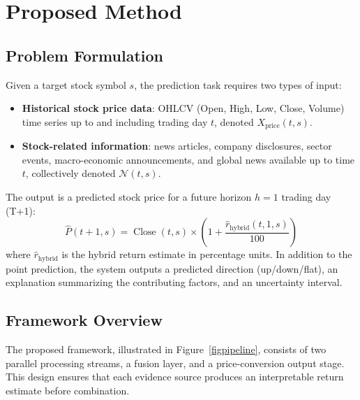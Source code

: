 \documentclass[runningheads]{llncs}
\begin{document}
\section{Proposed Method}
\label{secmethod}

\subsection{Problem Formulation}

Given a target stock symbol $s$, the prediction task requires two types of input:
\begin{itemize}
\item \textbf{Historical stock price data}: OHLCV (Open, High, Low, Close, Volume) time series up to and including trading day $t$, denoted $X_{\mathrm{price}}(t, s)$.
\item \textbf{Stock-related information}: news articles, company disclosures, sector events, macro-economic announcements, and global news available up to time $t$, collectively denoted $\mathcal{N}(t, s)$.
\end{itemize}

The output is a predicted stock price for a future horizon $h = 1$ trading day (T+1):
\begin{equation}
\widehat{P}(t+1, s) = \operatorname{Close}(t, s) \times \left(1 + \frac{\hat{r}_{\mathrm{hybrid}}(t, 1, s)}{100}\right)
\label{eqpredicted-price}
\end{equation}
where $\hat{r}_{\mathrm{hybrid}}$ is the hybrid return estimate in percentage units. In addition to the point prediction, the system outputs a predicted direction (up/down/flat), an explanation summarizing the contributing factors, and an uncertainty interval.

\subsection{Framework Overview}
\label{secoverview}

The proposed framework, illustrated in Figure~\ref{figpipeline}, consists of two parallel processing streams, a fusion layer, and a price-conversion output stage. This design ensures that each evidence source produces an interpretable return estimate before combination.
\end{document}

